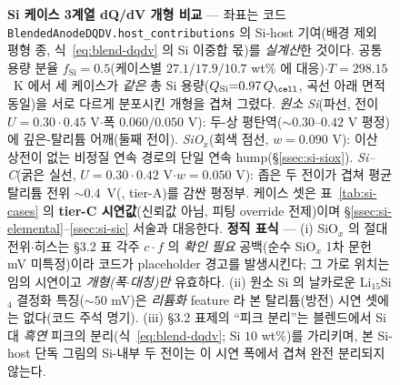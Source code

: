 \begin{figure}[t]
\caption{\textbf{Si 케이스 3계열 dQ/dV 개형 비교} --- 좌표는 코드
\texttt{BlendedAnodeDQDV.host\_contributions} 의 Si-host 기여(배경 제외 평형 종, 식~\eqref{eq:blend-dqdv}
의 Si 이중합 몫)를 \emph{실계산}한 것이다. 공통 용량 분율 $f_\mathrm{Si}{=}0.5$(케이스별 $27.1/17.9/10.7$
wt\% 에 대응)$\cdot$$T{=}298.15$~K 에서 세 케이스가 \emph{같은} 총 Si 용량($Q_\mathrm{Si}{=}0.97\,Q_\cell$,
곡선 아래 면적 동일)을 서로 다르게 분포시킨 개형을 겹쳐 그렸다. \emph{원소 Si}(파선, 전이 $U{=}0.30\cdot0.45$
V$\cdot$폭 $0.060/0.050$ V): 두-상 평탄역($\sim$$0.30$--$0.42$ V 평정)에 깊은-탈리튬 어깨(둘째 전이). \emph{SiO$_x$}(회색
점선, $w{=}0.090$ V): 이산 상전이 없는 비정질 연속 경로의 단일 연속 hump(\S\ref{ssec:si-siox}). \emph{Si--C}(굵은
실선, $U{=}0.30\cdot0.42$ V$\cdot$$w{=}0.050$ V): 좁은 두 전이가 겹쳐 평균 탈리튬 전위 $\sim$$0.4$~V(\cite{andersen_sic2019},
tier-A)를 감싼 평정부. 케이스 셋은 표~\ref{tab:si-cases} 의 \textbf{tier-C 시연값}(신뢰값 아님, 피팅 override
전제)이며 \S\ref{ssec:si-elemental}--\ref{ssec:si-sic} 서술과 대응한다. \textbf{정직 표식} --- (i) SiO$_x$ 의
절대 전위$\cdot$히스는 §3.2 표 각주 $c\cdot f$ 의 \emph{확인 필요} 공백(순수 SiO$_x$ 1차 문헌 mV 미특정)이라 코드가
placeholder 경고를 발생시킨다; 그 가로 위치는 임의 시연이고 \emph{개형(폭$\cdot$대칭)만} 유효하다. (ii) 원소 Si 의
날카로운 Li$_{15}$Si$_4$ 결정화 특징($\sim$$50$ mV)은 \emph{리튬화} feature 라 본 탈리튬(방전) 시연 셋에는 없다(코드
주석 명기). (iii) §3.2 표제의 ``피크 분리''는 블렌드에서 Si 대 \emph{흑연} 피크의 분리(식~\eqref{eq:blend-dqdv};
Si $10$ wt\%\cite{naboka_sic2021})를 가리키며, 본 Si-host 단독 그림의 Si-내부 두 전이는 이 시연 폭에서 겹쳐 완전
분리되지 않는다.}
\label{fig:si-cases-shape}
\end{figure}
